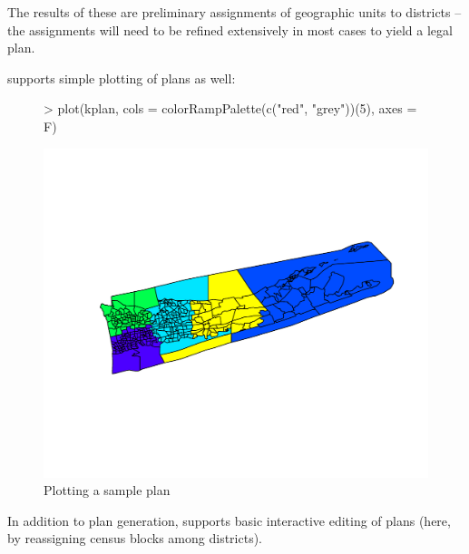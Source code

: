 \documentclass[article]{JSSstyle/jss}
\begin{document}
The results of these are preliminary assignments of geographic units to districts -- the assignments will need to be refined extensively in most cases to yield a legal plan. 

 supports simple plotting of plans as well:

  \begin{figure}[!h]
\begin{Schunk}
\begin{Sinput}
> plot(kplan, cols = colorRampPalette(c("red", "grey"))(5), axes = F)
\end{Sinput}
\end{Schunk}
\includegraphics{bardJSS-plot1a}
  \caption{\label{fig:rplot1} Plotting a sample plan}
  \end{figure}

\newpage
In addition to plan generation,  supports basic interactive editing of plans (here, by reassigning census blocks among districts).
\end{document}
